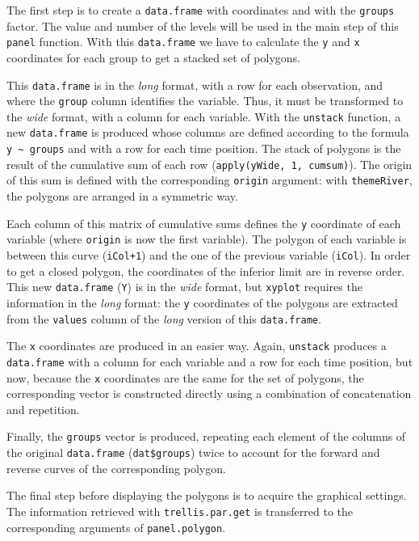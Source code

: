 \documentclass[smallroyalvopaper]{memoir}
\begin{document}
The first step is to create a \texttt{data.frame} with coordinates and with
the \texttt{groups} factor. The value and number of the levels will be used
in the main step of this \texttt{panel} function. With this \texttt{data.frame} we
have to calculate the \texttt{y} and \texttt{x} coordinates for each group to get a
stacked set of polygons.

This \texttt{data.frame} is in the \emph{long} format, with a row for each
observation, and where the \texttt{group} column identifies the
variable. Thus, it must be transformed to the \emph{wide} format, with a
column for each variable. With the \texttt{unstack} function, a new
\texttt{data.frame} is produced whose columns are defined according to the
formula \texttt{y \textasciitilde{} groups} and with a row for each time position. The stack
of polygons is the result of the cumulative sum of each row
(\texttt{apply(yWide, 1, cumsum)}). The origin of this sum is defined with
the corresponding \texttt{origin} argument: with \texttt{themeRiver}, the polygons
are arranged in a symmetric way.

Each column of this matrix of cumulative sums defines the \texttt{y}
coordinate of each variable (where \texttt{origin} is now the first
variable). The polygon of each variable is between this curve
(\texttt{iCol+1}) and the one of the previous variable (\texttt{iCol}). In order to
get a closed polygon, the coordinates of the inferior limit are in
reverse order. This new \texttt{data.frame} (\texttt{Y}) is in the \emph{wide} format,
but \texttt{xyplot} requires the information in the \emph{long} format: the \texttt{y}
coordinates of the polygons are extracted from the \texttt{values} column of
the \emph{long} version of this \texttt{data.frame}.

The \texttt{x} coordinates are produced in an easier way. Again, \texttt{unstack}
produces a \texttt{data.frame} with a column for each variable and a row
for each time position, but now, because the \texttt{x} coordinates are the same
for the set of polygons, the corresponding vector is constructed
directly using a combination of concatenation and repetition.

Finally, the \texttt{groups} vector is produced, repeating each element of
the columns of the original \texttt{data.frame} (\texttt{dat\$groups}) twice to
account for the forward and reverse curves of the corresponding
polygon.

The final step before displaying the polygons is to acquire the
graphical settings. The information retrieved with
\texttt{trellis.par.get} is transferred to the corresponding arguments of
\texttt{panel.polygon}.
\end{document}

